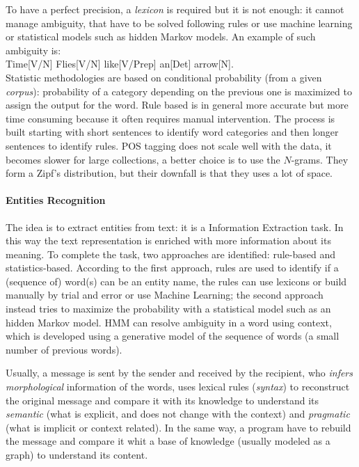 \documentclass[11pt, a4page]{article}
\begin{document}
To have a perfect precision, a \textit{lexicon} is required but it is not enough: it cannot manage ambiguity, that have to be solved following rules or use machine learning or statistical models such as hidden Markov models. An example of such ambiguity is: \\Time[V/N] Flies[V/N] like[V/Prep] an[Det] arrow[N].\\
Statistic methodologies are based on conditional probability (from a given \textit{corpus}): probability of a category depending on the previous one is maximized to assign the output for the word.
Rule based is in general more accurate but more time consuming because it often requires manual intervention.
The process is built starting with short sentences to identify word categories and then longer sentences to identify rules.
POS tagging does not scale well with the data, it becomes slower for large collections, a better choice is to use the $N$-grams. They form a Zipf's distribution, but their downfall is that they uses a lot of space.

\paragraph{Entities Recognition}
The idea is to extract entities from text: it is a Information Extraction task.
In this way the text representation is enriched with more information about its meaning.
To complete the task, two approaches are identified: rule-based and statistics-based.
According to the first approach, rules are used to identify if a (sequence of) word(s) can be an entity name, the rules can use lexicons or build manually by trial and error or use Machine Learning; the second approach instead tries to maximize the probability with a statistical model such as an hidden Markov model.
HMM can resolve ambiguity in a word using context, which is developed using a generative model of the sequence of words (a small number of previous words).
\newline

Usually, a message is sent by the sender and received by the recipient, who \textit{infers} \textit{morphological} information of the words, uses lexical rules (\textit{syntax}) to reconstruct the original message and compare it with its knowledge to understand its \textit{semantic} (what is explicit, and does not change with the context) and \textit{pragmatic} (what is implicit or context related).
In the same way, a program have to rebuild the message and compare it whit a base of knowledge (usually modeled as a graph) to understand its content.
\end{document}

